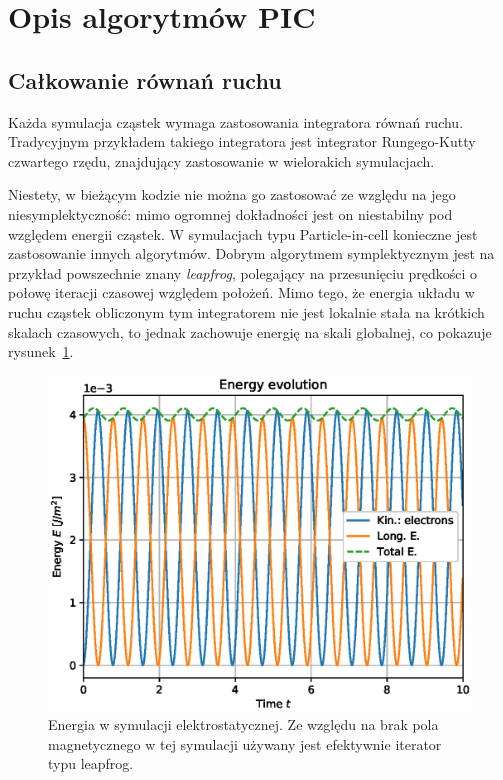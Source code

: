 \section[Opis algorytmów PIC]{Opis algorytmów PIC}\label{sec:implementation}%
\subsection{Całkowanie równań ruchu}
Każda symulacja cząstek wymaga zastosowania integratora równań ruchu.
Tradycyjnym przykładem takiego integratora jest integrator Rungego-Kutty
czwartego rzędu, znajdujący zastosowanie w wielorakich symulacjach.

Niestety, w bieżącym kodzie nie można go zastosować ze względu na jego
niesymplektyczność: mimo ogromnej dokładności jest on niestabilny pod
względem energii cząstek\cite{computational-physics}. W symulacjach typu
Particle-in-cell konieczne jest zastosowanie innych algorytmów. Dobrym
algorytmem symplektycznym jest na przykład powszechnie znany
\emph{leapfrog}, polegający na przesunięciu prędkości o połowę iteracji
czasowej względem położeń.\cite{computational-physics} Mimo tego, że energia
układu w ruchu cząstek obliczonym tym integratorem nie jest lokalnie stała na
krótkich skalach czasowych, to jednak zachowuje energię na skali globalnej, co
pokazuje rysunek~\ref{fig:ESE-energy}.

\begin{figure}[h!]
  \includegraphics{Images/ESE_energy_plot}
  \caption{Energia w symulacji elektrostatycznej. Ze względu na brak pola magnetycznego
  w tej symulacji używany jest efektywnie iterator typu leapfrog.\label{fig:ESE-energy}}
\end{figure}


